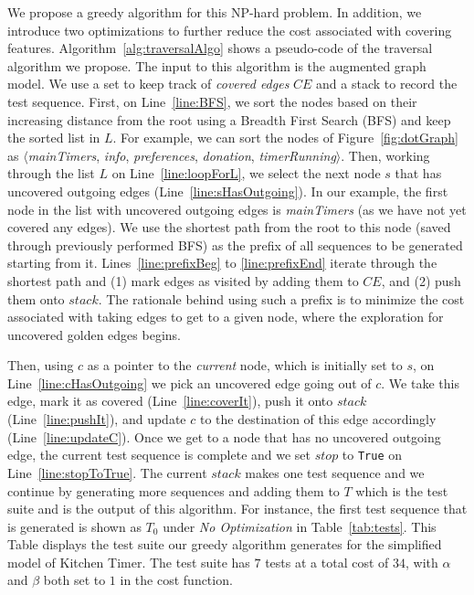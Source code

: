 We propose a greedy algorithm for this NP-hard problem. In addition, we introduce two optimizations to further reduce the cost associated with covering features. Algorithm~\ref{alg:traversalAlgo} shows a pseudo-code of the traversal algorithm we propose. The input to this algorithm is the augmented graph model. We use a set to keep track of \emph{covered edges} $CE$ and a stack to record the test sequence. First, on Line~\ref{line:BFS}, we sort the nodes based on their increasing distance from the root using a Breadth First Search (BFS) and keep the sorted list in $L$. For example, we can sort the nodes of Figure~\ref{fig:dotGraph} as $\langle$\emph{mainTimers}, \emph{info}, \emph{preferences}, \emph{donation}, \emph{timerRunning}$\rangle$. Then, working through the list $L$ on Line~\ref{line:loopForL}, we select the next node $s$ that has uncovered outgoing edges (Line~\ref{line:sHasOutgoing}). In our example, the first node in the list with uncovered outgoing edges is \emph{mainTimers} (as we have not yet covered any edges). We use the shortest path from the root to this node (saved through previously performed BFS) as the prefix of all sequences to be generated starting from it. Lines~\ref{line:prefixBeg} to \ref{line:prefixEnd} iterate through the shortest path and (1) mark edges as visited by adding them to $CE$, and (2) push them onto $stack$. The rationale behind using such a prefix is to minimize the cost associated with taking edges to get to a given node, where the exploration for uncovered golden edges begins. %

%


Then, using $c$ as a pointer to the \emph{current} node, which is initially set to $s$, on Line~\ref{line:cHasOutgoing} we pick an uncovered edge going out of $c$. We take this edge, mark it as covered (Line~\ref{line:coverIt}), push it onto $stack$ (Line~\ref{line:pushIt}), and update $c$ to the destination of this edge accordingly (Line~\ref{line:updateC}). Once we get to a node that has no uncovered outgoing edge, the current test sequence is complete and we set $stop$ to {\small\texttt{True}} on Line~\ref{line:stopToTrue}. The current $stack$ makes one test sequence and we continue by generating more sequences and adding them to $T$ which is the test suite and is the output of this algorithm. For instance, the first test sequence that is generated is shown as $T_0$ under \emph{No Optimization} in Table~\ref{tab:tests}. This Table displays the test suite our greedy algorithm generates for the simplified model of Kitchen Timer. The test suite has $7$ tests at a total cost of $34$, with $\alpha$ and $\beta$ both set to $1$ in the cost function.

